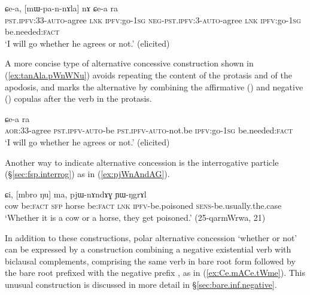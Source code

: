 \begin{exe}
\ex  \label{ex:pannAla.nA}
\gll  [pa-n-nɤla] ɕe-a, [mɯ-pa-n-nɤla] nɤ ɕe-a ra    \\
 \textsc{pst}.\textsc{ipfv}:3\fl{}3-\textsc{auto}-agree \textsc{lnk} \textsc{ipfv}:go-\textsc{1sg}
  \textsc{neg}-\textsc{pst}.\textsc{ipfv}:3\fl{}-\textsc{auto}-agree \textsc{lnk} \textsc{ipfv}:go-\textsc{1sg} be.needed:\textsc{fact} \\
\glt `I will go whether he agrees or not.' (elicited)
\end{exe}

A more concise type of alternative concessive construction shown in (\ref{ex:tanAla.pWnWNu}) avoids repeating the content of the protasis and of the apodosis, and marks the alternative by combining the affirmative () and negative () copulas after the verb in the protasis.

\begin{exe}
\ex  \label{ex:tanAla.pWnWNu}
 ɕe-a ra \\
\textsc{aor}:3\fl{}3-agree \textsc{pst}.\textsc{ipfv}-\textsc{auto}-be \textsc{pst}.\textsc{ipfv}-\textsc{auto}-not.be \textsc{ipfv}:go-\textsc{1sg} be.needed:\textsc{fact} \\
\glt `I will go whether he agrees or not.' (elicited)
\end{exe}
 
Another way to indicate alternative concession is the interrogative particle  (§\ref{sec:fsp.interrog}) as in (\ref{ex:pjWnAndAG}).

\begin{exe}
\ex  \label{ex:pjWnAndAG}
\gll [nɯŋa ŋu] ɕi, [mbro ŋu] ma, pjɯ-nɤndɤɣ ɲɯ-ŋgrɤl  \\
cow be:\textsc{fact} \textsc{sfp} horse  be:\textsc{fact} \textsc{lnk} \textsc{ipfv}-be.poisoned \textsc{sens}-be.usually.the.case \\
\glt `Whether it is a cow or a horse, they get poisoned.' (25-qarmWrwa, 21)
\end{exe}

In addition to these constructions, polar alternative concession `whether or not' can be expressed by a construction combining a negative existential verb with biclausal complements, comprising the same verb in bare root form followed by the bare root prefixed with the negative prefix , as in (\ref{ex:Ce.mACe.tWme}). This unusual construction is discussed in more detail in §\ref{sec:bare.inf.negative}.

